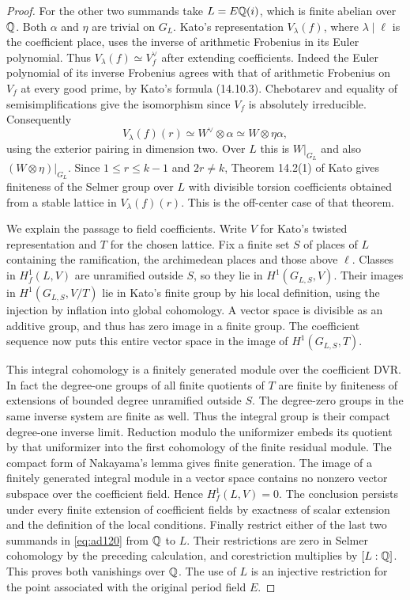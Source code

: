 \documentclass[a4paper,11pt]{article}
\theoremstyle{definition}
\theoremstyle{remark}
\numberwithin{equation}{section}
\begin{document}
\begin{proof}
For the other two summands take \(L=E\mathbb Q(i)\), which is finite
abelian over \(\mathbb Q\). Both \(\alpha\) and \(\eta\) are trivial
on \(G_L\). Kato's representation \(V_\lambda(f)\), where
\(\lambda\mid\ell\) is the coefficient place, uses the inverse
of arithmetic Frobenius in its Euler polynomial. Thus
\(V_\lambda(f)\simeq V_f^\vee\) after extending coefficients.
Indeed the Euler polynomial of its inverse Frobenius agrees
with that of arithmetic Frobenius on \(V_f\) at every good
prime, by Kato's formula (14.10.3). Chebotarev and equality
of semisimplifications give the isomorphism since \(V_f\) is
absolutely irreducible. Consequently
\[
 V_\lambda(f)(r)
       \simeq W^\vee\otimes\alpha
       \simeq W\otimes\eta\alpha ,
\]
using the exterior pairing in dimension two. Over \(L\) this
is \(W|_{G_L}\) and also \((W\otimes\eta)|_{G_L}\).
Since \(1\le r\le k-1\) and \(2r\ne k\), Theorem 14.2(1)
of Kato gives finiteness of the Selmer group over \(L\)
with divisible torsion coefficients obtained from a stable
lattice in \(V_\lambda(f)(r)\). This is the off-center case
of that theorem.~\cite{VI-IV-VI-kato120}

We explain the passage to field coefficients. Write \(V\)
for Kato's twisted representation and \(T\) for the chosen
lattice. Fix a finite set \(S\) of places of \(L\) containing
the ramification, the archimedean places and those above \(\ell\).
Classes in \(H^1_f(L,V)\) are unramified outside \(S\), so
they lie in \(H^1(G_{L,S},V)\). Their images in
\(H^1(G_{L,S},V/T)\) lie in Kato's finite group by his local
definition, using the injection by inflation into global
cohomology. A vector space is divisible as an additive group,
and thus has zero image in a finite group. The coefficient
sequence now puts this entire vector space in the image of
\(H^1(G_{L,S},T)\).

This integral cohomology is a finitely generated module over
the coefficient DVR. In fact the degree-one groups of all
finite quotients of \(T\) are finite by finiteness of
extensions of bounded degree unramified outside \(S\). The
degree-zero groups in the same inverse system are finite as
well. Thus the integral group is their compact degree-one
inverse limit. Reduction modulo the uniformizer embeds its
quotient by that uniformizer into the first cohomology of
the finite residual module. The compact form of Nakayama's
lemma gives finite generation. The image of a finitely
generated integral module in a vector space contains no
nonzero vector subspace over the coefficient field. Hence
\(H^1_f(L,V)=0\). The conclusion persists under every finite
extension of coefficient fields by exactness of scalar
extension and the definition of the local conditions.
Finally restrict either of the last two summands in
\eqref{eq:ad120} from \(\mathbb Q\) to \(L\). Their restrictions
are zero in Selmer cohomology by the preceding calculation,
and corestriction multiplies by \([L:\mathbb Q]\). This proves
both vanishings over \(\mathbb Q\). The use of \(L\) is an
injective restriction for the point associated with the
original period field \(E\).
\end{proof}
\end{document}

